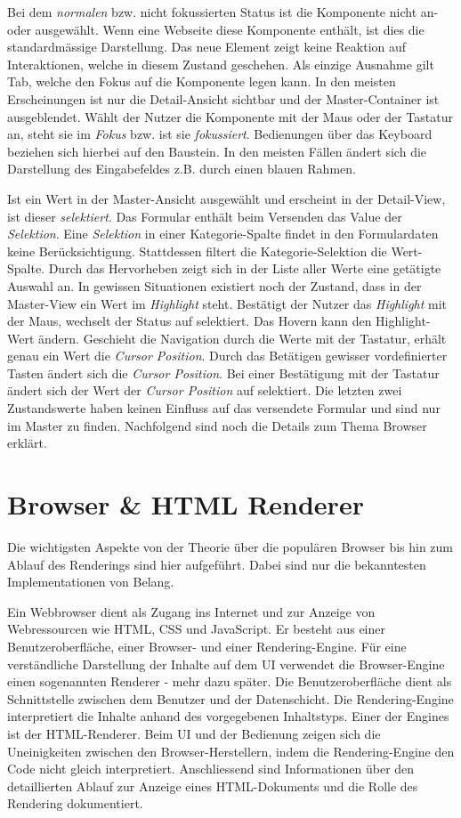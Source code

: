 Bei dem \emph{normalen} bzw. nicht fokussierten Status ist die Komponente nicht an- oder ausgewählt. 
Wenn eine Webseite diese Komponente enthält, ist dies die standardmässige Darstellung. 
Das neue Element zeigt keine Reaktion auf Interaktionen, welche in diesem Zustand geschehen. 
Als einzige Ausnahme gilt Tab, welche den Fokus auf die Komponente legen kann. 
In den meisten Erscheinungen ist nur die Detail-Ansicht sichtbar und der Master-Container ist ausgeblendet. 
Wählt der Nutzer die Komponente mit der Maus oder der Tastatur an, steht sie im \emph{Fokus} bzw. ist sie \emph{fokussiert}. 
Bedienungen über das Keyboard beziehen sich hierbei auf den Baustein. 
In den meisten Fällen ändert sich die Darstellung des Eingabefeldes z.B. durch einen blauen Rahmen. 

Ist ein Wert in der Master-Ansicht ausgewählt und erscheint in der Detail-View, ist dieser \emph{selektiert}. 
Das Formular enthält beim Versenden das Value der \emph{Selektion}. 
Eine \emph{Selektion} in einer Kategorie-Spalte findet in den Formulardaten keine Berücksichtigung. 
Stattdessen filtert die Kategorie-Selektion die Wert-Spalte. 
Durch das Hervorheben zeigt sich in der Liste aller Werte eine getätigte Auswahl an. 
In gewissen Situationen existiert noch der Zustand, dass in der Master-View ein Wert im \emph{Highlight} steht. 
Bestätigt der Nutzer das \emph{Highlight} mit der Maus, wechselt der Status auf selektiert. 
Das Hovern kann den Highlight-Wert ändern. 
Geschieht die Navigation durch die Werte mit der Tastatur, erhält genau ein Wert die \emph{Cursor Position}. 
Durch das Betätigen gewisser vordefinierter Tasten ändert sich die \emph{Cursor Position}. 
Bei einer Bestätigung mit der Tastatur ändert sich der Wert der \emph{Cursor Position} auf selektiert. 
Die letzten zwei Zustandswerte haben keinen Einfluss auf das versendete Formular und sind nur im Master zu finden. 
Nachfolgend sind noch die Details zum Thema Browser erklärt. 


\section{Browser \& HTML Renderer}
\label{sec:browserRenderer}

Die wichtigsten Aspekte von der Theorie über die populären Browser bis hin zum Ablauf des Renderings sind hier aufgeführt. 
Dabei sind nur die bekanntesten Implementationen von Belang. 

Ein Webbrowser dient als Zugang ins Internet und zur Anzeige von Webressourcen wie HTML, CSS und JavaScript. 
Er besteht aus einer Benutzeroberfläche, einer Browser- und einer Rendering-Engine. 
Für eine verständliche Darstellung der Inhalte auf dem UI verwendet die Browser-Engine einen sogenannten Renderer - mehr dazu später. 
Die Benutzeroberfläche dient als Schnittstelle zwischen dem Benutzer und der Datenschicht. 
Die Rendering-Engine interpretiert die Inhalte anhand des vorgegebenen Inhaltstyps. 
Einer der Engines ist der HTML-Renderer. 
Beim UI und der Bedienung zeigen sich die Uneinigkeiten zwischen den Browser-Herstellern, indem die Rendering-Engine den Code nicht gleich interpretiert. 
Anschliessend sind Informationen über den detaillierten Ablauf zur Anzeige eines HTML-Dokuments und die Rolle des Rendering dokumentiert. 


